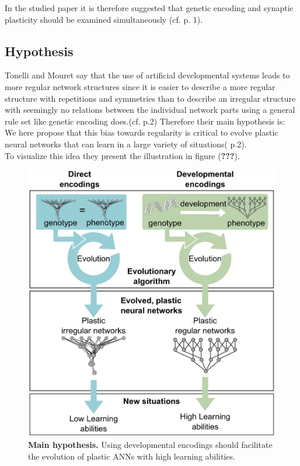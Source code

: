 \documentclass[12pt,twoside]{article}
\theoremstyle{plain}
\theoremstyle{definition}
\theoremstyle{remark}
\begin{document}
In the studied paper \cite{citeulike:12788284} it is therefore suggested that genetic encoding and synaptic plasticity should be examined simultaneously (cf. \cite{citeulike:12788284} p. 1).\\

\subsection{Hypothesis}
Tonelli and Mouret say that the use of artificial developmental systems leads to more regular network structures since it is easier to describe a more regular structure with repetitions and symmetries than to describe an irregular structure with seemingly no relations between the individual network parts using a general rule set like genetic encoding does.(cf. \cite{citeulike:12788284} p.2)
Therefore their main hypothesis is:
\glqq We here propose that this bias towards regularity is critical to evolve plastic neural networks that can learn in a large variety of situations\grqq{}(\cite{citeulike:12788284} p.2).\\
To visualize this idea they present the illustration in figure (\textbf{???}).

\begin{figure}
	\begin{center}
		\includegraphics[totalheight=0.4\textheight]{direct_vs_developemental.png}
		\caption[\textbf{Main hypothesis.} Using developmental encodings should facilitate the evolution of plastic ANNs with high learning abilities.
		]{\textbf{Main hypothesis.} Using developmental encodings should facilitate the evolution of plastic ANNs with high learning abilities.
			 \footnotemark} %
	\end{center}
\end{figure}
\end{document}
